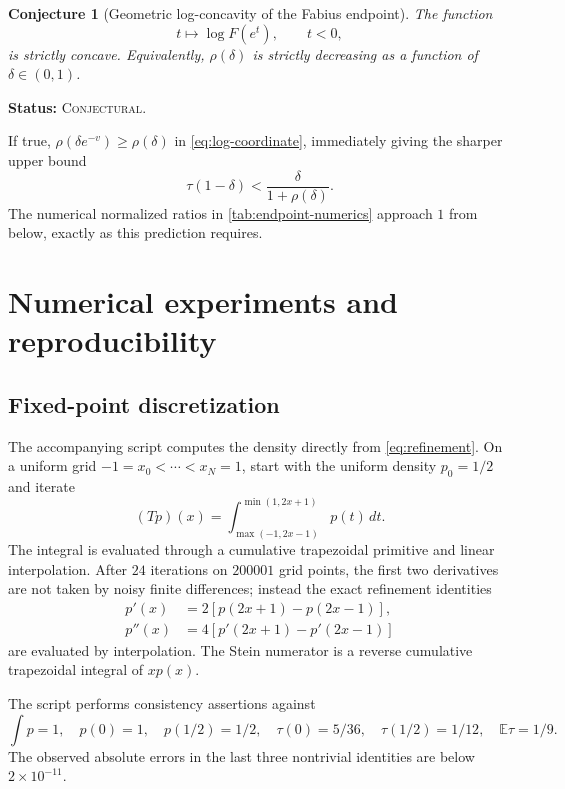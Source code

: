\documentclass[11pt,oneside]{article}
\newtheorem{conjecture}[theorem]{Conjecture}
\theoremstyle{definition}
\theoremstyle{remark}
\newcommand{\E}{\mathbb E}
\newcommand{\Conjectural}{\textcolor{statusred}{\textsc{Conjectural}}}
\newcommand{\Status}[1]{\par\smallskip\noindent\textbf{Status:} #1.\par\smallskip}
\begin{document}
\begin{conjecture}[Geometric log-concavity of the Fabius endpoint]
\label{conj:geometric-concavity}
The function
\[
 t\longmapsto\log F(e^t),\qquad t<0,
\]
is strictly concave.  Equivalently, $\rho(\delta)$ is strictly decreasing as a
function of $\delta\in(0,1)$.
\end{conjecture}
\Status{\Conjectural}

If true, $\rho(\delta e^{-v})\ge\rho(\delta)$ in
\eqref{eq:log-coordinate}, immediately giving the sharper upper bound
\begin{equation}\label{eq:sharp-conjectural-upper}
 \tau(1-\delta)<\frac{\delta}{1+\rho(\delta)}.
\end{equation}
The numerical normalized ratios in \cref{tab:endpoint-numerics} approach $1$
from below, exactly as this prediction requires.

\section{Numerical experiments and reproducibility}

\subsection{Fixed-point discretization}
The accompanying script  computes the
density directly from \eqref{eq:refinement}.  On a uniform grid
$-1=x_0<\cdots<x_N=1$, start with the uniform density $p_0=1/2$ and iterate
\begin{equation}\label{eq:numerical-T}
 (Tp)(x)=\int_{\max(-1,2x-1)}^{\min(1,2x+1)}p(t)\,dt.
\end{equation}
The integral is evaluated through a cumulative trapezoidal primitive and linear
interpolation.  After $24$ iterations on $200001$ grid points, the first two
derivatives are not taken by noisy finite differences; instead the exact
refinement identities
\begin{align}
 p'(x)&=2[p(2x+1)-p(2x-1)],\\
 p''(x)&=4[p'(2x+1)-p'(2x-1)]
\end{align}
are evaluated by interpolation.  The Stein numerator is a reverse cumulative
trapezoidal integral of $xp(x)$.

The script performs consistency assertions against
\[
 \int p=1,\quad p(0)=1,\quad p(1/2)=1/2,
 \quad \tau(0)=5/36,\quad \tau(1/2)=1/12,
 \quad \E\tau=1/9.
\]
The observed absolute errors in the last three nontrivial identities are below
$2\times10^{-11}$.
\end{document}
